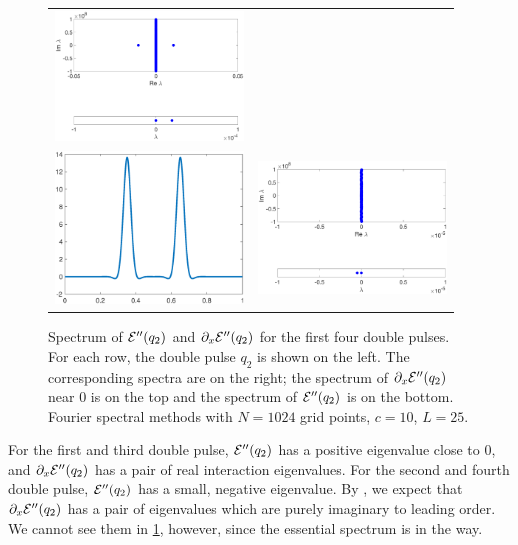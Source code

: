 \documentclass[thesis.tex]{subfiles}
\begin{document}
\begin{figure}
\begin{center}
\begin{tabular}{cc}
\includegraphics[width=5cm]{images/kdv5numerics/double3spec} \\
\includegraphics[width=5cm]{images/kdv5numerics/double4} &
\includegraphics[width=5cm]{images/kdv5numerics/double4spec} \\
\end{tabular}
\caption{Spectrum of $\mathcal{E}''(q_2)$ and $\partial_x \mathcal{E}
''(q_2)$ for the first four double pulses. For each row, the double pulse $q_2$ is shown on the left. The corresponding spectra are on the right; the spectrum of $\partial_x \mathcal{E}''(q_2)$ near 0 is on the top and the spectrum of $\mathcal{E}''(q_2)$ is on the bottom. Fourier spectral methods with $N = 1024$ grid points, $c = 10$, $L = 25$.}
\label{fig:KdV5doublespec}
\end{center}
\end{figure}

For the first and third double pulse, $\mathcal{E}''(q_2)$ has a positive eigenvalue close to 0, and $\partial_x \mathcal{E}''(q_2)$ has a pair of real interaction eigenvalues. For the second and fourth double pulse, $\mathcal{E}''(q_2)$ has a small, negative eigenvalue. By \cite[Theorem 2.3]{Pelinovsky2007}, we expect that $\partial_x \mathcal{E}''(q_2)$ has a pair of eigenvalues which are purely imaginary to leading order. We cannot see them in \cref{fig:KdV5doublespec}, however, since the essential spectrum is in the way.
\end{document}
